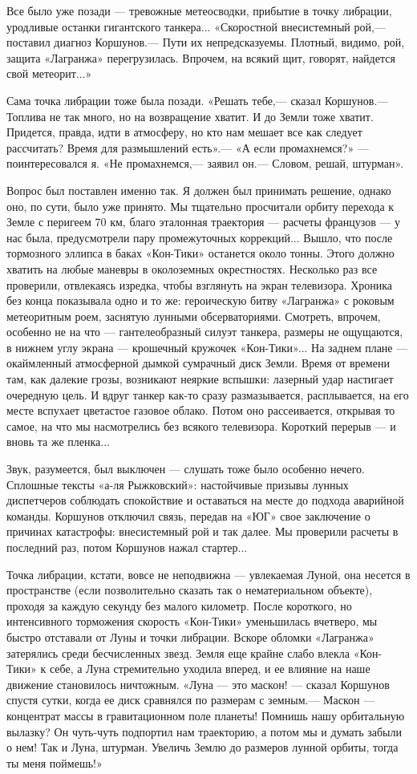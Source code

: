 \documentclass[11pt,a4paper,oneside]{article}
\begin{document}
Все было уже позади — тревожные метеосводки, прибытие в точку либрации, уродливые останки гигантского танкера... «Скоростной внесистемный рой,— поставил диагноз Коршунов.— Пути их непредсказуемы. Плотный, видимо, рой, защита «Лагранжа» перегрузилась. Впрочем, на всякий щит, говорят, найдется свой метеорит...»

Сама точка либрации тоже была позади. «Решать тебе,— сказал Коршунов.— Топлива не так много, но на возвращение хватит. И до Земли тоже хватит. Придется, правда, идти в атмосферу, но кто нам мешает все как следует рассчитать? Время для размышлений есть».— «А если промахнемся?» — поинтересовался я. «Не промахнемся,— заявил он.— Словом, решай, штурман».

Вопрос был поставлен именно так. Я должен был принимать решение, однако оно, по сути, было уже принято. Мы тщательно просчитали орбиту перехода к Земле с перигеем 70 км, благо эталонная траектория — расчеты французов — у нас была, предусмотрели пару промежуточных коррекций... Вышло, что после тормозного эллипса в баках «Кон-Тики» останется около тонны. Этого должно хватить на любые маневры в околоземных окрестностях. Несколько раз все проверили, отвлекаясь изредка, чтобы взглянуть на экран телевизора. Хроника без конца показывала одно и то же: героическую битву «Лагранжа» с роковым метеоритным роем, заснятую лунными обсерваториями. Смотреть, впрочем, особенно не на что — гантелеобразный силуэт танкера, размеры не ощущаются, в нижнем углу экрана — крошечный кружочек «Кон-Тики»... На заднем плане — окаймленный атмосферной дымкой сумрачный диск Земли. Время от времени там, как далекие грозы, возникают неяркие вспышки: лазерный удар настигает очередную цель. И вдруг танкер как-то сразу размазывается, расплывается, на его месте вспухает цветастое газовое облако. Потом оно рассеивается, открывая то самое, на что мы насмотрелись без всякого телевизора. Короткий перерыв — и вновь та же пленка...

Звук, разумеется, был выключен — слушать тоже было особенно нечего. Сплошные тексты «а-ля Рыжковский»: настойчивые призывы лунных диспетчеров соблюдать спокойствие и оставаться на месте до подхода аварийной команды. Коршунов отключил связь, передав на «ЮГ» свое заключение о причинах катастрофы: внесистемный рой и так далее. Мы проверили расчеты в последний раз, потом Коршунов нажал стартер...

Точка либрации, кстати, вовсе не неподвижна — увлекаемая Луной, она несется в пространстве (если позволительно сказать так о нематериальном объекте), проходя за каждую секунду без малого километр. После короткого, но интенсивного торможения скорость «Кон-Тики» уменьшилась вчетверо, мы быстро отставали от Луны и точки либрации. Вскоре обломки «Лагранжа» затерялись среди бесчисленных звезд. Земля еще крайне слабо влекла «Кон- Тики» к себе, а Луна стремительно уходила вперед, и ее влияние на наше движение становилось ничтожным. «Луна — это маскон! — сказал Коршунов спустя сутки, когда ее диск сравнялся по размерам с земным.— Маскон — концентрат массы в гравитационном поле планеты! Помнишь нашу орбитальную вылазку? Он чуть-чуть подпортил нам траекторию, а потом мы и думать забыли о нем! Так и Луна, штурман. Увеличь Землю до размеров лунной орбиты, тогда ты меня поймешь!»
\end{document}
